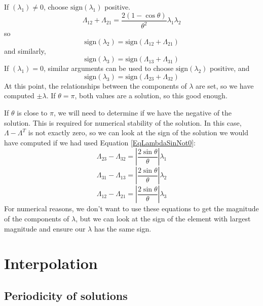 \documentclass[10pt,letterpaper,oneside,notitlepage]{article}
\begin{document}
If $(\lambda_1) \neq 0$, choose $\mathrm{sign}(\lambda_1)$ positive. 
\begin{equation}
\Lambda_{12}+\Lambda_{21} = \frac{2\left(1-\cos\theta\right)}{\theta^2}\lambda_1\lambda_2   
\end{equation}
so 
\begin{equation}
\mathrm{sign}(\lambda_2) = \mathrm{sign}(\Lambda_{12}+\Lambda_{21}) 
\end{equation}
and similarly,
\begin{equation}
\mathrm{sign}(\lambda_3) = \mathrm{sign}(\Lambda_{13}+\Lambda_{31}) 
\end{equation}
If $(\lambda_1) = 0$, similar arguments can be used to choose $\mathrm{sign}(\lambda_2)$ positive, and 
\begin{equation}
\mathrm{sign}(\lambda_3) = \mathrm{sign}(\Lambda_{23}+\Lambda_{32}) 
\end{equation}
At this point, the relationships between the components of $\lambda$ are set, so we have computed $\pm\lambda$. If $\theta=\pi$, both values are a solution, so this good enough.

If $\theta$ is close to $\pi$, we will need to determine if we have the negative of the solution. This is required for numerical stability of the solution.
In this case, $\Lambda-\Lambda^T$ is not exactly zero, so we can look at the sign of the solution we would have computed if we had used Equation \ref{EqLambdaSinNot0}:
\begin{equation}
\Lambda_{23}-\Lambda_{32} = \left|\frac{2\sin\theta}{\theta}\right|\lambda_1
\end{equation}
\begin{equation}
\Lambda_{31}-\Lambda_{13} = \left|\frac{2\sin\theta}{\theta}\right|\lambda_2
\end{equation}
\begin{equation}
\Lambda_{12}-\Lambda_{21} = \left|\frac{2\sin\theta}{\theta}\right|\lambda_3
\end{equation}
For numerical reasons, we don't want to use these equations to get the magnitude of the components of $\lambda$, but we can look at the sign of the element with largest magnitude and ensure our $\lambda$ has the same sign.

\section{Interpolation}
\subsection{Periodicity of solutions} 
\end{document}
